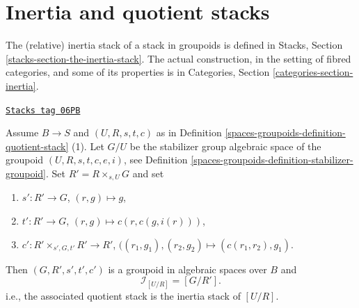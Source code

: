 \section{Inertia and quotient stacks}
\label{spaces-groupoids-section-inertia}
The (relative) inertia stack of a stack in groupoids is defined in
Stacks, Section \ref{stacks-section-the-inertia-stack}.
The actual construction, in the setting of fibred categories, and some
of its properties is in
Categories, Section \ref{categories-section-inertia}.

\begin{lemma}
\label{spaces-groupoids-lemma-presentation-inertia}
\href{https://stacks.math.columbia.edu/tag/06PB}{\texttt{Stacks tag 06PB}}

Assume $B \to S$ and $(U, R, s, t, c)$ as in
Definition \ref{spaces-groupoids-definition-quotient-stack} (1).
Let $G/U$ be the stabilizer group algebraic space of the groupoid
$(U, R, s, t, c, e, i)$, see
Definition \ref{spaces-groupoids-definition-stabilizer-groupoid}.
Set $R' = R \times_{s, U} G$ and set
\begin{enumerate}
\item $s' : R' \to G$, $(r, g) \mapsto g$,
\item $t' : R' \to G$, $(r, g) \mapsto c(r, c(g, i(r)))$,
\item $c' : R' \times_{s', G, t'} R' \to R'$,
$((r_1, g_1), (r_2, g_2) \mapsto (c(r_1, r_2), g_1)$.
\end{enumerate}
Then $(G, R', s', t', c')$ is a groupoid in algebraic spaces over $B$
and
$$
\mathcal{I}_{[U/R]} = [G/ R'].
$$
i.e., the associated quotient stack is the inertia stack of $[U/R]$.
\end{lemma}

